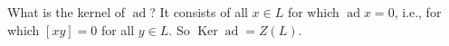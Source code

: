 What is the kernel of $\operatorname{ad}$? It consists of all $x \in L$ for which $\operatorname{ad} x = 0$, i.e., for which $[xy] = 0$ for all $y \in L$. So $\operatorname{Ker} \operatorname{ad} = Z(L)$.
